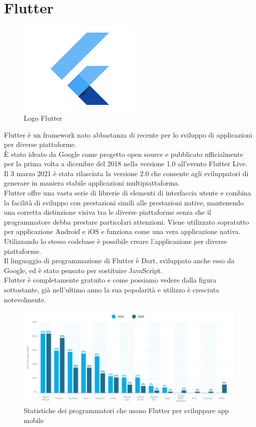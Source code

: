 \section{Flutter}
\begin{figure}[htbp]	
	\centering
	\includegraphics[width=6cm]{immagini/flutterlogo.jpg}
	\caption{Logo Flutter}
	\label{fig:Logo Flutter}
\end{figure}
Flutter \cite{flutterprogramma} è un framework nato abbastanza di recente per lo sviluppo di applicazioni per diverse piattaforme.\\
È stato ideato da Google come progetto open source e pubblicato ufficialmente per la prima volta a dicembre del 2018 nella versione 1.0 all'evento Flutter Live.\\
Il 3 marzo 2021 è stata rilasciata la versione 2.0 che consente agli sviluppatori di generare in maniera stabile applicazioni multipiattaforma.\\
Flutter offre una vasta serie di librerie di elementi di interfaccia utente e combina la facilità di sviluppo con prestazioni simili alle prestazioni native, mantenendo una corretta distinzione visiva tra le diverse piattaforme senza che il programmatore debba prestare particolari attenzioni.
Viene utilizzato sopratutto per applicazione Android e iOS e funziona come una vera applicazione nativa.\\
Utilizzando lo stesso codebase è possibile creare l'applicazione per diverse piattaforme.\\
Il linguaggio di programmazione di Flutter è Dart, sviluppato anche esso da Google, ed è stato pensato per sostituire JavaScript.\\
Flutter è completamente gratuito e come possiamo vedere dalla figura sottostante, già nell'ultimo anno la sua popolarità e utilizzo è cresciuta notevolmente.\\
\begin{figure}[htbp]	
	\centering
	\includegraphics[width=13cm]{immagini/statisticheflutter.png}
	\caption{Statistiche dei programmatori che usano Flutter per sviluppare app mobile}
	\label{fig:Statistiche dei programmatori che usano Flutter per sviluppare app mobile}
\end{figure}

